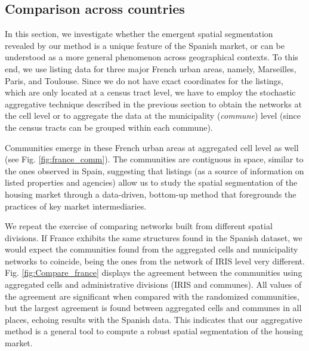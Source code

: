 \subsection{Comparison across countries}\label{sec:France}

In this section, we investigate whether the emergent spatial segmentation revealed by our method is a unique feature of the Spanish market, or can be understood as a more general phenomenon across geographical contexts. To this end, we use listing data for three major French urban areas, namely, Marseilles, Paris, and Toulouse. Since we do not have exact coordinates for the listings, which are only located at a census tract level, we have to employ the stochastic aggregative technique described in the previous section to obtain the networks at the cell level or to aggregate the data at the municipality (\textit{commune}) level (since the census tracts can be grouped within each commune). 

Communities emerge in these French urban areas at aggregated cell level as well (see Fig. \ref{fig:france_comm}). The communities are contiguous in space, similar to the ones observed in Spain, suggesting that listings (as a source of information on listed properties and agencies) allow us to study the spatial segmentation of the housing market through a data-driven, bottom-up method that foregrounds the practices of key market intermediaries.

We repeat the exercise of comparing networks built from different spatial divisions. If France exhibits the same structures found in the Spanish dataset, we would expect the communities found from the aggregated cells and municipality networks to coincide, being the ones from the network of IRIS level very different. Fig. \ref{fig:Compare_france} displays the agreement between the communities using aggregated cells and administrative divisions (IRIS and communes). All values of the agreement are significant when compared with the randomized communities, but the largest agreement is found between aggregated cells and communes in all places, echoing results with the Spanish data. This indicates that our aggregative method is a general tool to compute a robust spatial segmentation of the housing market.

